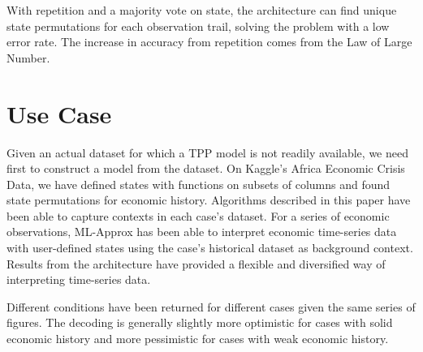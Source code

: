 \documentclass[10pt, conference, compsocconf]{IEEEtran}
\begin{document}
With repetition and a majority vote on state, the architecture can find unique state permutations for each observation trail, solving the problem with a low error rate. The increase in accuracy from repetition comes from the Law of Large Number. 

\section{Use Case}
Given an actual dataset for which a TPP model is not readily available, we need first to construct a model from the dataset. On Kaggle's Africa Economic Crisis Data, we have defined states with functions on subsets of columns and found state permutations for economic history. Algorithms described in this paper have been able to capture contexts in each case's dataset. For a series of economic observations, {\sc ML-Approx} has been able to interpret economic time-series data with user-defined states using the case's historical dataset as background context. Results from the architecture have provided a flexible and diversified way of interpreting time-series data.

Different conditions have been returned for different cases given the same series of figures. The decoding is generally slightly more optimistic for cases with solid economic history and more pessimistic for cases with weak economic history.
\end{document}

